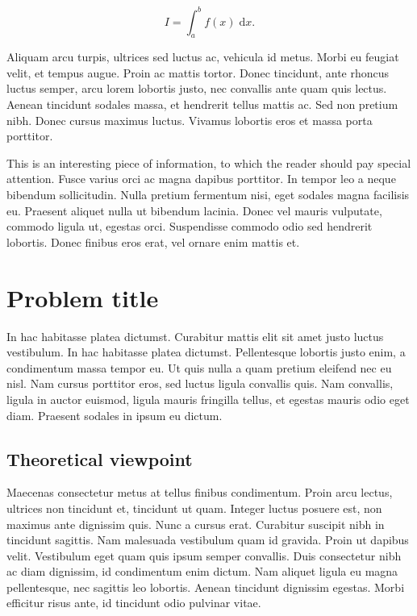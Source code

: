\documentclass{article}
\begin{document}
\begin{equation}
	I = \int_{a}^{b} f(x) \; \text{d}x.
\end{equation}

Aliquam arcu turpis, ultrices sed luctus ac, vehicula id metus. Morbi eu feugiat velit, et tempus augue. Proin ac mattis tortor. Donec tincidunt, ante rhoncus luctus semper, arcu lorem lobortis justo, nec convallis ante quam quis lectus. Aenean tincidunt sodales massa, et hendrerit tellus mattis ac. Sed non pretium nibh. Donec cursus maximus luctus. Vivamus lobortis eros et massa porta porttitor.

\begin{info} %
	This is an interesting piece of information, to which the reader should pay special attention. Fusce varius orci ac magna dapibus porttitor. In tempor leo a neque bibendum sollicitudin. Nulla pretium fermentum nisi, eget sodales magna facilisis eu. Praesent aliquet nulla ut bibendum lacinia. Donec vel mauris vulputate, commodo ligula ut, egestas orci. Suspendisse commodo odio sed hendrerit lobortis. Donec finibus eros erat, vel ornare enim mattis et.
\end{info}


\section{Problem title} %

In hac habitasse platea dictumst. Curabitur mattis elit sit amet justo luctus vestibulum. In hac habitasse platea dictumst. Pellentesque lobortis justo enim, a condimentum massa tempor eu. Ut quis nulla a quam pretium eleifend nec eu nisl. Nam cursus porttitor eros, sed luctus ligula convallis quis. Nam convallis, ligula in auctor euismod, ligula mauris fringilla tellus, et egestas mauris odio eget diam. Praesent sodales in ipsum eu dictum.


\subsection{Theoretical viewpoint}

Maecenas consectetur metus at tellus finibus condimentum. Proin arcu lectus, ultrices non tincidunt et, tincidunt ut quam. Integer luctus posuere est, non maximus ante dignissim quis. Nunc a cursus erat. Curabitur suscipit nibh in tincidunt sagittis. Nam malesuada vestibulum quam id gravida. Proin ut dapibus velit. Vestibulum eget quam quis ipsum semper convallis. Duis consectetur nibh ac diam dignissim, id condimentum enim dictum. Nam aliquet ligula eu magna pellentesque, nec sagittis leo lobortis. Aenean tincidunt dignissim egestas. Morbi efficitur risus ante, id tincidunt odio pulvinar vitae.
\end{document}
